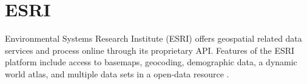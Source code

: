 \section{ESRI}

Environmental Systems Research Institute (ESRI) offers geospatial related data
services and process online through its proprietary API.  Features of the ESRI
platform include access to basemaps, geocoding, demographic data, a dynamic
world atlas, and multiple data sets in a open-data resource \cite{ESRI2018}.
